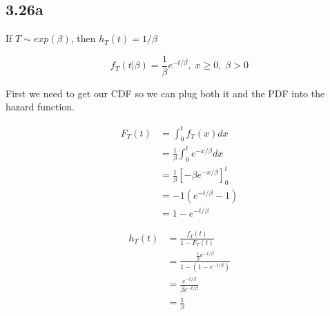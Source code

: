 \subsection*{3.26a}

If $T \sim exp(\beta)$, then $h_T(t) = 1/\beta$

\[
	f_T(t|\beta) = \frac{1}{\beta} e^{-t/\beta}, \; x\geq0, \; \beta > 0
\]

First we need to get our CDF so we can plug both it and the PDF into the hazard function.

\begin{align*}
	F_T(t) &= \int_0^t f_T(x) dx \\
	&= \frac{1}{\beta} \int_0^t e^{-x/\beta} dx \\
	&= \frac{1}{\beta} \left[ -\beta e^{-x/\beta} \right]_0^t \\
	&= -1\left( e^{-t/\beta} - 1 \right) \\
	&= 1 - e^{-t/\beta}
\end{align*}

\begin{align*}
	h_T(t) &= \frac{f_T(t)}{1 - F_T(t)} \\
	&= \frac{\frac{1}{\beta} e^{-t/\beta}}{1-\left( 1-e^{-t/\beta} \right)} \\
	&= \frac{e^{-t/\beta}}{\beta e^{-t/\beta}} \\
	&= \frac{1}{\beta}
\end{align*}
